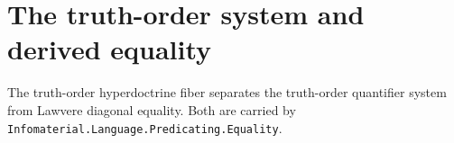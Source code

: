 \section{The truth-order system and derived equality}

The truth-order hyperdoctrine fiber separates the truth-order quantifier
system from Lawvere diagonal equality. Both are carried by
\texttt{Infomaterial.Language.Predicating.Equality}.



